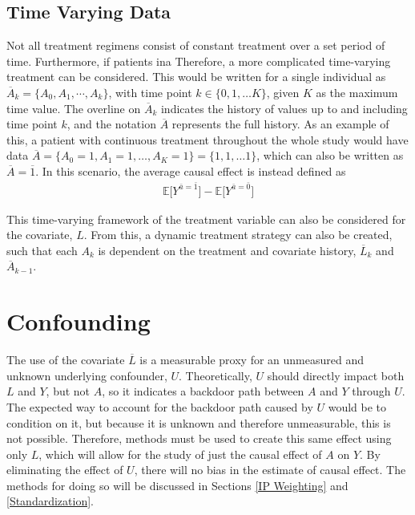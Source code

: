 \subsection{Time Varying Data} \label{Time-varying}
Not all treatment regimens consist of constant treatment over a set period of time.  Furthermore, if patients ina Therefore, a more complicated time-varying treatment can be considered.  This would be written for a single individual as $\overline{A}_k = \{A_0, A_1, \cdots, A_k \}$, with time point $k \in \{ 0, 1, \dots K\}$, given $K$ as the maximum time value.  The overline on $\overline{A}_k$ indicates the history of values up to and including time point $k$, and the notation $\overline{A}$ represents the full history.  As an example of this, a patient with continuous treatment throughout the whole study would have data $\overline{A} = \{A_0 = 1, A_1 = 1, \dots, A_K = 1 \}  = \{1,1,\dots 1 \}$, which can also be written as $\overline{A} = \overline{1}$.  In this scenario, the average causal effect is instead defined as 
\begin{align} \mathbb{E}\bigg[Y^{\bar{a} = \bar{1}}\bigg] -  \mathbb{E}\bigg[Y^{\bar{a} = \bar{0}}\bigg] \end{align} 

This time-varying framework of the treatment variable can also be considered for the covariate, $L$.  From this, a dynamic treatment strategy can also be created, such that each $A_k$ is dependent on the treatment and covariate history, $\overline{L}_k$ and $\overline{A}_{k-1}$.   


\section{Confounding} 

The use of the covariate $\overline{L}$ is a measurable proxy for an unmeasured and unknown underlying confounder, $U$.  Theoretically, $U$ should directly impact both $L$ and $Y$, but not $A$, so it indicates a backdoor path between $A$ and $Y$ through $U$.  \cite{wright2015international}  The expected way to account for the backdoor path caused by $U$ would be to condition on it, but because it is unknown and therefore unmeasurable, this is not possible.  Therefore, methods must be used to create this same effect using only $L$, which will allow for the study of just the causal effect of $A$ on $Y$.  By eliminating the effect of $U$, there will no bias in the estimate of causal effect.  The methods for doing so will be discussed in Sections \ref{IP Weighting} and \ref{Standardization}.  


